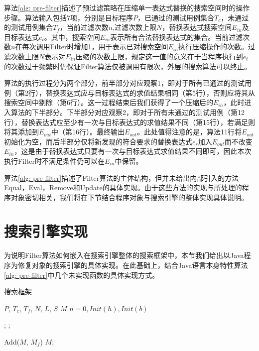 算法\ref{alg: pre-filter}描述了预过滤策略在压缩单一表达式替换的搜索空间时的操作步骤。算法输入包括7项，分别是目标程序$P$，已通过的测试用例集合$T_c$，未通过的测试用例集合$T_f$，当前过滤次数$n$,过滤次数上限$N$，替换表达式搜索空间$E_{in}$及目标表达式$e_t$。其中，搜索空间$E_{in}$表示所有合法替换表达式的集合。当前过滤次数$n$在每次调用Filter时增加1，用于表示已对搜索空间$E_{in}$执行压缩操作的次数。过滤次数上限$N$表示对$E_{in}$压缩的次数上限，规定这一值的意义在于当程序执行到$e_t$的次数过于频繁时仍保证Filter算法仅被调用有限次，外层的搜索算法可以终止。

算法的执行过程分为两个部分，前半部分对应观察1，即对于所有已通过的测试用例（第2行），替换表达式应与目标表达式的求值结果相同（第5行），否则应将其从搜索空间中剔除（第6行）。这一过程结束后我们获得了一个压缩后的$E_{in}$，此时进入算法的下半部分。下半部分对应观察2，即对于所有未通过的测试用例（第12行），替换表达式应至少有一次与目标表达式的求值结果不同（第15行），若满足则将其添加到$E_{out}$中（第16行）。最终输出$E_{out}$。此处值得注意的是，算法11行将$E_{out}$初始化为空，而后半部分仅将新发现的符合要求的替换表达式$e_r$加入$E_{out}$而不改变$E_{in}$，这是由于替换表达式只要有一次与目标表达式求值结果不同即可，因此本次执行Filter时不满足条件仍可以在$E_{in}$中保留。

算法\ref{alg: pre-filter}描述了Filter算法的主体结构，但并未给出内部引入的方法Equal，Eval，Remove和Update的具体实现。由于这些方法的实现与所处理的程序对象密切相关，我们将在下节结合程序对象与搜索引擎的整体实现具体说明。

\section{搜索引擎实现}

为说明Filter算法如何嵌入在搜索引擎整体的搜索框架中，本节我们给出以Java程序为修复对象的搜索引擎的具体实现。在此基础上，结合Java语言本身特性算法\ref{alg: pre-filter}中几个未实现函数的具体实现方式。

\begin{algorithm}
	\caption{搜索框架}
	\label{alg:search-frame}
	\begin{algorithmic}[1]
		\renewcommand{\algorithmicrequire}{\textbf{Input:}}
		\renewcommand\algorithmicensure {\textbf{Output:} }
		\REQUIRE $P$, $T_c$, $T_f$, $N$, $L$, $S$
		\ENSURE $M$
			\ENDFOR
			\STATE $n = 0, Init(h), Init(b)$
			
				;
				;

			\STATE Add($M$, $M_f$)
		\ENDFOR
		\RETURN $M$;
		
	\end{algorithmic}
\end{algorithm}


